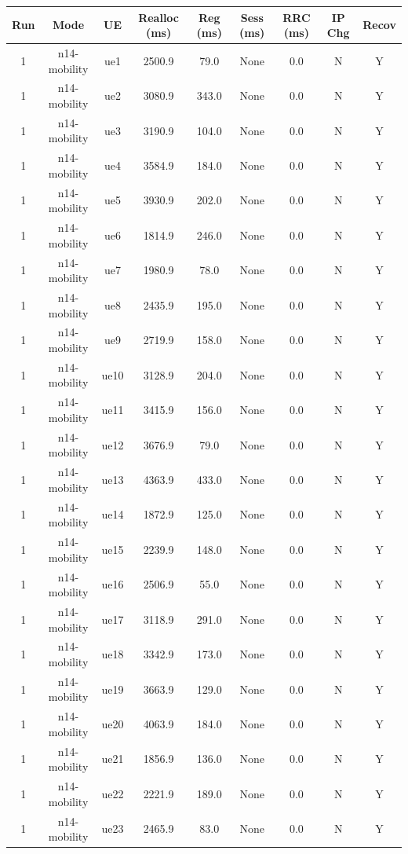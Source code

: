 \begin{table}[ht]
\centering
\begin{tabular}{|c|c|c|c|c|c|c|c|c|}
\hline
Run & Mode & UE & Realloc (ms) & Reg (ms) & Sess (ms) & RRC (ms) & IP Chg & Recov \\
\hline
1 & n14-mobility & ue1 & 2500.9 & 79.0 & None & 0.0 & N & Y \\
1 & n14-mobility & ue2 & 3080.9 & 343.0 & None & 0.0 & N & Y \\
1 & n14-mobility & ue3 & 3190.9 & 104.0 & None & 0.0 & N & Y \\
1 & n14-mobility & ue4 & 3584.9 & 184.0 & None & 0.0 & N & Y \\
1 & n14-mobility & ue5 & 3930.9 & 202.0 & None & 0.0 & N & Y \\
1 & n14-mobility & ue6 & 1814.9 & 246.0 & None & 0.0 & N & Y \\
1 & n14-mobility & ue7 & 1980.9 & 78.0 & None & 0.0 & N & Y \\
1 & n14-mobility & ue8 & 2435.9 & 195.0 & None & 0.0 & N & Y \\
1 & n14-mobility & ue9 & 2719.9 & 158.0 & None & 0.0 & N & Y \\
1 & n14-mobility & ue10 & 3128.9 & 204.0 & None & 0.0 & N & Y \\
1 & n14-mobility & ue11 & 3415.9 & 156.0 & None & 0.0 & N & Y \\
1 & n14-mobility & ue12 & 3676.9 & 79.0 & None & 0.0 & N & Y \\
1 & n14-mobility & ue13 & 4363.9 & 433.0 & None & 0.0 & N & Y \\
1 & n14-mobility & ue14 & 1872.9 & 125.0 & None & 0.0 & N & Y \\
1 & n14-mobility & ue15 & 2239.9 & 148.0 & None & 0.0 & N & Y \\
1 & n14-mobility & ue16 & 2506.9 & 55.0 & None & 0.0 & N & Y \\
1 & n14-mobility & ue17 & 3118.9 & 291.0 & None & 0.0 & N & Y \\
1 & n14-mobility & ue18 & 3342.9 & 173.0 & None & 0.0 & N & Y \\
1 & n14-mobility & ue19 & 3663.9 & 129.0 & None & 0.0 & N & Y \\
1 & n14-mobility & ue20 & 4063.9 & 184.0 & None & 0.0 & N & Y \\
1 & n14-mobility & ue21 & 1856.9 & 136.0 & None & 0.0 & N & Y \\
1 & n14-mobility & ue22 & 2221.9 & 189.0 & None & 0.0 & N & Y \\
1 & n14-mobility & ue23 & 2465.9 & 83.0 & None & 0.0 & N & Y \\

\end{tabular}
\end{table}
